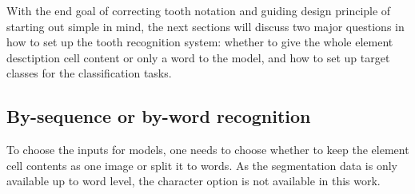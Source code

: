 \documentclass[english,twoside,openright]{UH_DS_MSc}
\begin{document}
With the end goal of correcting tooth notation and guiding design principle of starting out simple in mind, the next sections will discuss two major questions 
in how to set up the tooth recognition system: whether to give the whole element desctiption cell content
 or only a word to the model, and how to set up target classes for the classification tasks.

\subsection{By-sequence or by-word recognition}

To choose the inputs for models, one needs to choose whether to keep the
element cell contents as one image or split it to words. As the segmentation 
data is only available up to word level, the character option is not available in this work.

\end{document}
